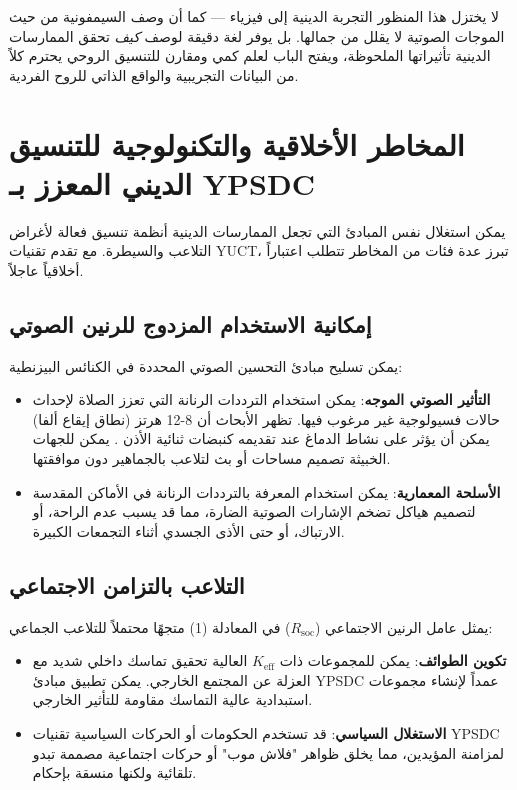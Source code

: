 \documentclass[12pt,a4paper]{article}
\begin{document}
	لا يختزل هذا المنظور التجربة الدينية إلى فيزياء — كما أن وصف السيمفونية من حيث الموجات الصوتية لا يقلل من جمالها. بل يوفر لغة دقيقة لوصف \emph{كيف} تحقق الممارسات الدينية تأثيراتها الملحوظة، ويفتح الباب لعلم كمي ومقارن للتنسيق الروحي يحترم كلاً من البيانات التجريبية والواقع الذاتي للروح الفردية.
	
	\section{المخاطر الأخلاقية والتكنولوجية للتنسيق الديني المعزز بـ YPSDC}
	\label{sec:risks}
	
	يمكن استغلال نفس المبادئ التي تجعل الممارسات الدينية أنظمة تنسيق فعالة لأغراض التلاعب والسيطرة. مع تقدم تقنيات YUCT، تبرز عدة فئات من المخاطر تتطلب اعتباراً أخلاقياً عاجلاً.
	
	\subsection{إمكانية الاستخدام المزدوج للرنين الصوتي}
	
	يمكن تسليح مبادئ التحسين الصوتي المحددة في الكنائس البيزنطية:
	\begin{itemize}
		\item \textbf{التأثير الصوتي الموجه}: يمكن استخدام الترددات الرنانة التي تعزز الصلاة لإحداث حالات فسيولوجية غير مرغوب فيها. تظهر الأبحاث أن 8-12 هرتز (نطاق إيقاع ألفا) يمكن أن يؤثر على نشاط الدماغ عند تقديمه كنبضات ثنائية الأذن \cite{Garcia2021}. يمكن للجهات الخبيثة تصميم مساحات أو بث لتلاعب بالجماهير دون موافقتها.
		
		\item \textbf{الأسلحة المعمارية}: يمكن استخدام المعرفة بالترددات الرنانة في الأماكن المقدسة لتصميم هياكل تضخم الإشارات الصوتية الضارة، مما قد يسبب عدم الراحة، أو الارتباك، أو حتى الأذى الجسدي أثناء التجمعات الكبيرة.
	\end{itemize}
	
	\subsection{التلاعب بالتزامن الاجتماعي}
	
	يمثل عامل الرنين الاجتماعي ($R_{\mathrm{soc}}$) في المعادلة (1) متجهًا محتملاً للتلاعب الجماعي:
	\begin{itemize}
		\item \textbf{تكوين الطوائف}: يمكن للمجموعات ذات \(K_{\mathrm{eff}}\) العالية تحقيق تماسك داخلي شديد مع العزلة عن المجتمع الخارجي. يمكن تطبيق مبادئ YPSDC عمداً لإنشاء مجموعات استبدادية عالية التماسك مقاومة للتأثير الخارجي.
		
		\item \textbf{الاستغلال السياسي}: قد تستخدم الحكومات أو الحركات السياسية تقنيات YPSDC لمزامنة المؤيدين، مما يخلق ظواهر "فلاش موب" أو حركات اجتماعية مصممة تبدو تلقائية ولكنها منسقة بإحكام.
	\end{itemize}
	
\end{document}
